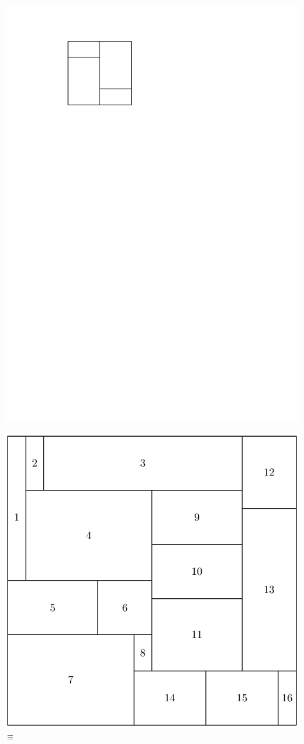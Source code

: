 \documentclass[11pt]{beamer}%
\begin{document}
\begin{frame}
\begin{center}
      \includegraphics[page=2,height=.1\textheight]{figures.pdf}
    \end{center}   
    \begin{center}
      \includegraphics[height=.4\textheight]{strongRectangulation.pdf} $\equiv$ 

\end{center}
\end{frame}
\end{document}
